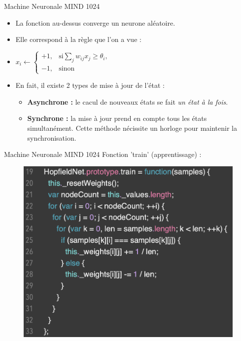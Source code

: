 \documentclass{beamer}
\begin{document}
\begin{frame}{Machine Neuronale MIND 1024}
    \begin{itemize}[<+-| alert@+>] %
        \item La fonction au-dessus converge un neurone aléatoire.
        \item Elle correspond à la règle que l'on a vue :
        \item $
                        x_i \leftarrow
                        \begin{cases}
                        +1,& \text{si} \sum_j w_{ij} x_j \geq \theta_i,\\
                        -1,& \text{sinon}
                        \end{cases}
                    $
        \item En fait, il existe 2 types de mise à jour de l'état :
            \begin{itemize}[<+-| alert@+>] %
                \item \textbf{Asynchrone :} le cacul de nouveaux états se fait \textit{un état à la fois}.
                \item \textbf{Synchrone :} la mise à jour prend en compte tous les états simultanément. Cette méthode nécissite un horloge pour maintenir la synchronisation.
            \end{itemize}
    \end{itemize}
\end{frame}

\begin{frame}{Machine Neuronale MIND 1024}
    Fonction 'train' (apprentissage) :
    \begin{figure}
        \centering
        \includegraphics[width=0.7\linewidth]{pic/alg2.png}
    \end{figure}
\end{frame}  
\end{document}
